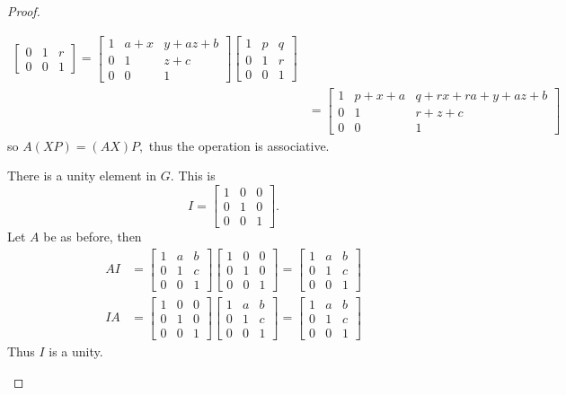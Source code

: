 \documentclass{article}
\begin{document}
\begin{itemize}
\begin{proof}
\begin{enumerate}
\begin{align*}
\begin{bmatrix}
					0 & 1 & r \\
					0 & 0 & 1
				\end{bmatrix} = \begin{bmatrix}
					1 & a+x & y+az+b \\
					0 & 1 & z+c \\
					0 & 0 & 1
				\end{bmatrix} \begin{bmatrix}
					1 & p & q \\
					0 & 1 & r \\
					0 & 0 & 1
				\end{bmatrix} \\
				&= \begin{bmatrix}
					1 & p+x+a & q+rx+ra+y+az+b \\
					0 & 1 & r+z+c \\
					0 & 0 & 1
				\end{bmatrix}
			\end{align*} so $A(XP)=(AX)P,$ thus the operation is associative. 

			\ii There is a unity element in $G.$ This is \[I=\begin{bmatrix}
					1 & 0 & 0 \\
					0 & 1 & 0 \\
					0 & 0 & 1
			\end{bmatrix}. \] Let $A$ be as before, then
			\begin{align*}
				AI &= \begin{bmatrix}
					1 & a & b \\
					0 & 1 & c \\
					0 & 0 & 1
				\end{bmatrix} \begin{bmatrix}
					1 & 0 & 0 \\
					0 & 1 & 0 \\
					0 & 0 & 1
				\end{bmatrix} = \begin{bmatrix}
					1 & a & b \\
					0 & 1 & c \\
					0 & 0 & 1
				\end{bmatrix} \\
				IA &= \begin{bmatrix}
					1 & 0 & 0 \\
					0 & 1 & 0 \\
					0 & 0 & 1
				\end{bmatrix} \begin{bmatrix}
					1 & a & b \\
					0 & 1 & c \\
					0 & 0 & 1
				\end{bmatrix} = \begin{bmatrix}
					1 & a & b \\
					0 & 1 & c \\
					0 & 0 & 1
				\end{bmatrix}
			\end{align*}
			Thus $I$ is a unity.


\end{enumerate}
\end{proof}
\end{itemize}
\end{document}
